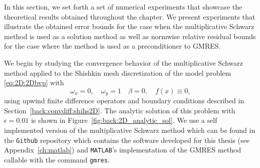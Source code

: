 In this section, we set forth a set of numerical experiments that showcase the
theoretical results obtained throughout the chapter. We present experiments
that illustrate the obtained error bounds for the case when the multiplicative
Schwarz method is used as a solution method as well as normwise relative
residual bounds for the case where the method is used as a preconditioner to
GMRES.

We begin by studying the convergence behavior of the multiplicative Schwarz
method applied to the Shishkin mesh discretization of the model problem
\eqref{eq:2D:2Dbvp} with
\[
\omega_x=0,\quad \omega_y=1\quad\beta=0,\quad f(x)\equiv 0,
\]
using upwind finite difference operators and boundary conditions
described in Section~\ref{back:convdiff:shihs2D}. The analytic solution of this
problem with $\epsilon=0.01$ is shown in Figure~\ref{fig:back:2D_analytic_sol}.
We use a self implemented version of the multiplicative Schwarz method which
can be found in the \texttt{Github} repository which contains the software
developed for this thesis (see Appendix~\ref{ch:matlab}) and \texttt{MATLAB}'s
implementation of the GMRES method callable with the command \texttt{gmres}.

